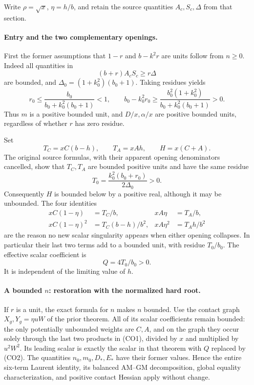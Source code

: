 Write $\rho=\sqrt x$, $\eta=h/b$, and retain the source quantities
$A_c,S_c,\Delta$ from that section.

\paragraph{Entry and the two complementary openings.}
First the former assumptions that $1-r$ and $b-k^2r$ are units follow
from $n\geq0$.  Indeed all quantities in
\[
                 (b+r)A_cS_c\geq r\Delta
\]
are bounded, and $\Delta_0=(1+k_0^2)(b_0+1)$.  Taking residues yields
\[
 r_0\leq\frac{b_0}{b_0+k_0^2(b_0+1)}<1,
 \qquad
 b_0-k_0^2r_0\geq
 \frac{b_0^2(1+k_0^2)}{b_0+k_0^2(b_0+1)}>0.
\]
Thus $m$ is a positive bounded unit, and $D/x,\alpha/x$ are positive
bounded units, regardless of whether $r$ has zero residue.

Set
\[
 T_C=xC(b-h),\qquad T_A=xAh,\qquad H=x(C+A).
\]
The original source formulas, with their apparent opening denominators
cancelled, show that $T_C,T_A$ are bounded positive units and have the
same residue
\[
 T_0=\frac{k_0^2(b_0+r_0)}{2\Delta_0}>0.
\]
Consequently $H$ is bounded below by a positive real, although it may
be unbounded.  The four identities
\begin{align*}
 xC(1-\eta)&=T_C/b,&xA\eta&=T_A/b,\\
 xC(1-\eta)^2&=T_C(b-h)/b^2,&
 xA\eta^2&=T_Ah/b^2                                      \tag{CO1}
\end{align*}
are the reason no new scalar singularity appears when either opening
collapses.  In particular their last two terms add to a bounded unit,
with residue $T_0/b_0$.  The effective scalar coefficient is
\[
                         Q=4T_0/b_0>0.                  \tag{CO2}
\]
It is independent of the limiting value of $h$.

\paragraph{A bounded $n$: restoration with the normalized hard root.}
If $r$ is a unit, the exact formula for $n$ makes $n$ bounded.  Use the
contact graph $X_g,Y_g=\eta uW$ of the prior theorem.  All of its scalar
coefficients remain bounded: the only potentially unbounded weights
are $C,A$, and on the graph they occur solely through the last two
products in (CO1), divided by $x$ and multiplied by $u^2W^2$.
Its leading scalar is exactly the scalar in that theorem with $Q$
replaced by (CO2).  The quantities $n_0,m_0,D_*,E_*$ have their former
values.  Hence the entire six-term Laurent identity, its balanced
AM--GM decomposition, global equality characterization, and positive
contact Hessian apply without change.

